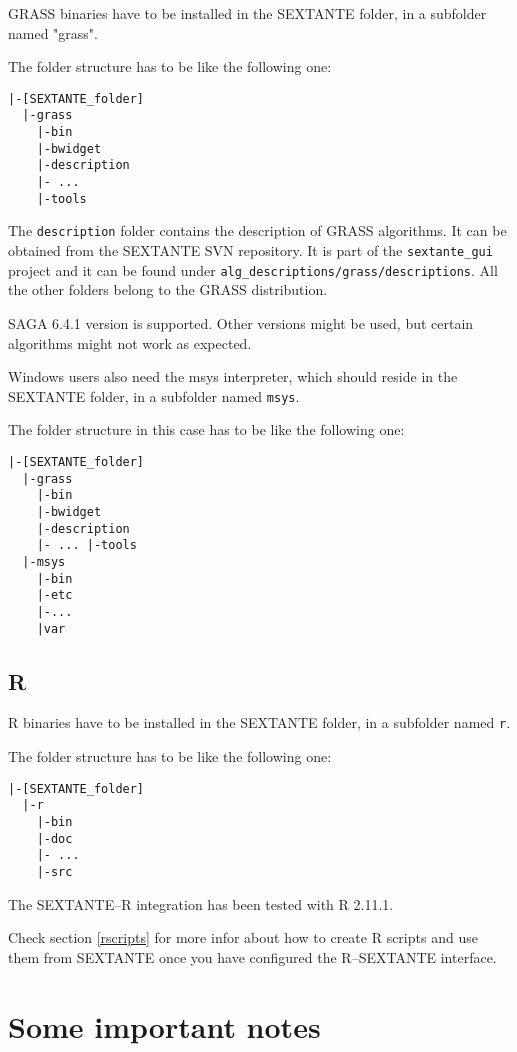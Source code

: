 GRASS binaries have to be installed in the SEXTANTE folder, in a subfolder named "grass".

The folder structure has to be like the following one:
\begin{verbatim}
|-[SEXTANTE_folder] 
  |-grass 
    |-bin 
    |-bwidget 
    |-description 
    |- ... 
    |-tools
\end{verbatim}    

The \texttt{description} folder contains the description of GRASS algorithms. It can be obtained from the SEXTANTE SVN repository. It is part of the \texttt{sextante\_gui} project and it can be found under \texttt{alg\_descriptions/grass/descriptions}. All the other folders belong to the GRASS distribution.

SAGA 6.4.1 version is supported. Other versions might be used, but certain algorithms might not work as expected.

Windows users also need the msys interpreter, which should reside in the SEXTANTE folder, in a subfolder named \texttt{msys}.

The folder structure in this case has to be like the following one:
\begin{verbatim}
|-[SEXTANTE_folder] 
  |-grass 
    |-bin 
    |-bwidget 
    |-description 
    |- ... |-tools 
  |-msys 
    |-bin 
    |-etc  
    |-... 
    |var
\end{verbatim}

\subsection{R}

R binaries have to be installed in the SEXTANTE folder, in a subfolder named \texttt{r}.

The folder structure has to be like the following one:

\begin{verbatim}
|-[SEXTANTE_folder] 
  |-r 
    |-bin 
    |-doc 
    |- ... 
    |-src
\end{verbatim}
    
The SEXTANTE--R integration has been tested with R 2.11.1.

Check section \ref{rscripts} for more infor about how to create R scripts and use them from SEXTANTE once you have configured the R--SEXTANTE interface.

\section{Some important notes}

